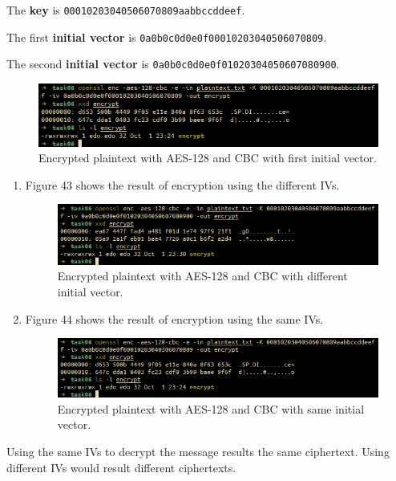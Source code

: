 \documentclass{article}
\begin{document}
The \textbf{key} is \texttt{00010203040506070809aabbccddeef}.

The first \textbf{initial vector} is \texttt{0a0b0c0d0e0f00010203040506070809}.

The second \textbf{initial vector} is \texttt{0a0b0c0d0e0f01020304050607080900}.

\begin{figure}[!ht]
    \centering
    \includegraphics[scale=0.68]{task06_1_1.png}
    \caption{Encrypted plaintext with AES-128 and CBC with first initial vector.}
\end{figure}

\begin{enumerate}
    \item Figure 43 shows the result of encryption using the different IVs.
        \begin{figure}[!ht]
            \centering
            \includegraphics[scale=0.68]{task06_1_2.png}
            \caption{Encrypted plaintext with AES-128 and CBC with different initial vector.}
        \end{figure}
    \item Figure 44 shows the result of encryption using the same IVs.
        \begin{figure}[!ht]
            \centering
            \includegraphics[scale=0.68]{task06_1_1.png}
            \caption{Encrypted plaintext with AES-128 and CBC with same initial vector.}
        \end{figure}
\end{enumerate}

Using the same IVs to decrypt the message results the same ciphertext. Using
different IVs would result different ciphertexts.
\end{document}
